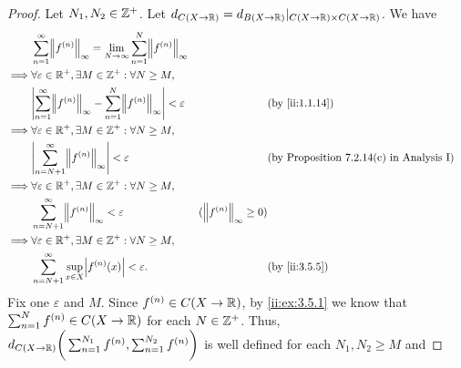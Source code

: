 \begin{proof}
  Let \(N_1, N_2 \in \mathbb{Z}^+\).
  Let \(d_{C(X \to \mathbb{R})} = d_{B(X \to \mathbb{R})}|_{C(X \to \mathbb{R}) \times C(X \to \mathbb{R})}\).
  We have
  \begin{align*}
             & \sum_{n = 1}^\infty \norm*{f^{(n)}}_\infty = \lim_{N \to \infty} \sum_{n = 1}^N \norm*{f^{(n)}}_\infty                                                                                     \\
    \implies & \forall \varepsilon \in \R^+, \exists M \in \Z^+ : \forall N \geq M,                                                                                                                       \\
             & \abs{\sum_{n = 1}^\infty \norm*{f^{(n)}}_\infty - \sum_{n = 1}^N \norm*{f^{(n)}}_\infty} < \varepsilon &                                 & \by{ii:1.1.14}                                  \\
    \implies & \forall \varepsilon \in \R^+, \exists M \in \Z^+ : \forall N \geq M,                                                                                                                       \\
             & \abs{\sum_{n = N + 1}^\infty \norm*{f^{(n)}}_\infty} < \varepsilon                                     &                                 & \text{(by Proposition 7.2.14(c) in Analysis I)} \\
    \implies & \forall \varepsilon \in \R^+, \exists M \in \Z^+ : \forall N \geq M,                                                                                                                       \\
             & \sum_{n = N + 1}^\infty \norm*{f^{(n)}}_\infty < \varepsilon                                           & (\norm*{f^{(n)}}_\infty \geq 0)                                                   \\
    \implies & \forall \varepsilon \in \R^+, \exists M \in \Z^+ : \forall N \geq M,                                                                                                                       \\
             & \sum_{n = N + 1}^\infty \sup_{x \in X} \abs{f^{(n)}(x)} < \varepsilon.                                 &                                 & \by{ii:3.5.5}
  \end{align*}
  Fix one \(\varepsilon\) and \(M\).
  Since \(f^{(n)} \in C(X \to \mathbb{R})\), by \cref{ii:ex:3.5.1} we know that \(\sum_{n = 1}^N f^{(n)} \in C(X \to \mathbb{R})\) for each \(N \in \mathbb{Z}^+\).
  Thus, \(d_{C(X \to \mathbb{R})}\bigg(\sum_{n = 1}^{N_1} f^{(n)}, \sum_{n = 1}^{N_2} f^{(n)}\bigg)\) is well defined for each \(N_1, N_2 \geq M\) and

\end{proof}
